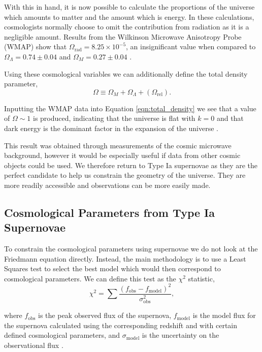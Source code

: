 \documentclass[twocolumn]{revtex4}
\begin{document}
With this in hand, it is now possible to calculate the proportions of the universe which amounts to matter and the amount which is energy. In these calculations, cosmologists normally choose to omit the contribution from radiation as it is a negligible amount. Results from the Wilkinson Microwave Anisotropy Probe (WMAP) show that $\Omega_{\text{rad}}=8.25 \times 10^{-5}$, an insignificant value when compared to $\Omega_{\Lambda}=0.74 \pm 0.04$ and $\Omega_{M} = 0.27 \pm 0.04$ \cite{mod_ast}. 

Using these cosmological variables we can additionally define the total density parameter,
\begin{equation}
\Omega \equiv \Omega_{M} + \Omega_{\Lambda} + (\Omega_{\text{rel}}).
\label{eqn:total_density}
\end{equation}

Inputting the WMAP data into Equation \ref{eqn:total_density} we see that a value of $\Omega \sim 1$ is produced, indicating that the universe is flat with $k=0$ and that dark energy is the dominant factor in the expansion of the universe \cite{mod_ast}.

This result was obtained through measurements of the cosmic microwave background, however it would be especially useful if data from other cosmic objects could be used. We therefore return to Type Ia supernovae as they are the perfect candidate to help us constrain the geometry of the universe. They are more readily accessible and observations can be more easily made. 

\vspace{-3ex}
\subsection{Cosmological Parameters from Type Ia Supernovae}
\vspace{-2ex}
To constrain the cosmological parameters using supernovae we do not look at the Friedmann equation directly. Instead, the main methodology is to use a Least Squares test to select the best model which would then correspond to cosmological parameters. We can define this test as the $\chi^2$ statistic, 
\begin{equation}
\chi^2 = \sum \frac{(f_\text{obs}-f_\text{model})^2}{\sigma_\text{obs}^2},
\label{eqn:chi_eqn}
\end{equation}

where $f_\text{obs}$ is the peak observed flux of the supernova, $f_\text{model}$ is the model flux for the supernova calculated using the corresponding redshift and with certain defined cosmological parameters, and $\sigma_\text{model}$ is the uncertainty on the observational flux \cite{script}.
\end{document}
